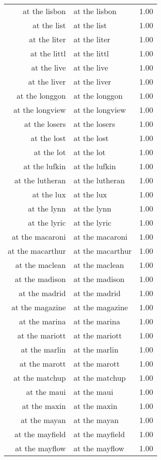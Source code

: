 \begin{table}[ht]
\begin{tabular}{rlr}
  at the lisbon & at the lisbon & 1.00 \\ 
  at the list & at the list & 1.00 \\ 
  at the liter & at the liter & 1.00 \\ 
  at the littl & at the littl & 1.00 \\ 
  at the live & at the live & 1.00 \\ 
  at the liver & at the liver & 1.00 \\ 
  at the longgon & at the longgon & 1.00 \\ 
  at the longview & at the longview & 1.00 \\ 
  at the losers & at the losers & 1.00 \\ 
  at the lost & at the lost & 1.00 \\ 
  at the lot & at the lot & 1.00 \\ 
  at the lufkin & at the lufkin & 1.00 \\ 
  at the lutheran & at the lutheran & 1.00 \\ 
  at the lux & at the lux & 1.00 \\ 
  at the lynn & at the lynn & 1.00 \\ 
  at the lyric & at the lyric & 1.00 \\ 
  at the macaroni & at the macaroni & 1.00 \\ 
  at the macarthur & at the macarthur & 1.00 \\ 
  at the maclean & at the maclean & 1.00 \\ 
  at the madison & at the madison & 1.00 \\ 
  at the madrid & at the madrid & 1.00 \\ 
  at the magazine & at the magazine & 1.00 \\ 
  at the marina & at the marina & 1.00 \\ 
  at the mariott & at the mariott & 1.00 \\ 
  at the marlin & at the marlin & 1.00 \\ 
  at the marott & at the marott & 1.00 \\ 
  at the matchup & at the matchup & 1.00 \\ 
  at the maui & at the maui & 1.00 \\ 
  at the maxin & at the maxin & 1.00 \\ 
  at the mayan & at the mayan & 1.00 \\ 
  at the mayfield & at the mayfield & 1.00 \\ 
  at the mayflow & at the mayflow & 1.00 \\ 

\end{tabular}
\end{table}
